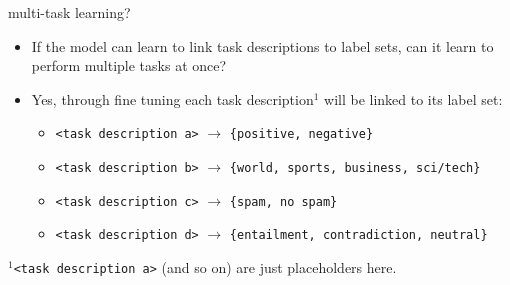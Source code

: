 
\begin{frame}{multi-task learning?}

\vfill

\begin{itemize}
	\item \ques If the model can learn to link task descriptions to label sets, can it learn to perform multiple tasks at once?
	\item Yes, through fine tuning each task description$^1$ will be linked to its label set:
			\begin{itemize}
				\item \texttt{<task description a>} $\to$ \texttt{\{positive, negative\}}
				\item \texttt{<task description b>} $\to$ \texttt{\{world, sports, business, sci/tech\}} 
				\item \texttt{<task description c>} $\to$ \texttt{\{spam, no spam\}}
				\item \texttt{<task description d>} $\to$ \texttt{\{entailment, contradiction, neutral\}}
			\end{itemize}
\end{itemize}

\vfill

$^1$\footnotesize{\texttt{<task description a>} (and so on) are just placeholders here.}
\end{frame}



